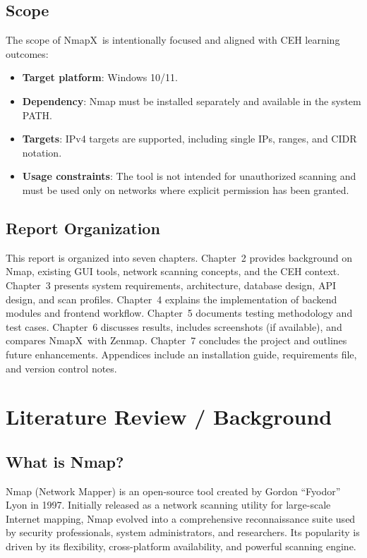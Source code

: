\documentclass[12pt, a4paper]{report}
\newcommand{\NmapX}{NmapX}
\begin{document}
\section{Scope}
The scope of \NmapX\ is intentionally focused and aligned with CEH learning outcomes:
\begin{itemize}[leftmargin=2.2em]
  \item \textbf{Target platform}: Windows 10/11.
  \item \textbf{Dependency}: Nmap must be installed separately and available in the system PATH.
  \item \textbf{Targets}: IPv4 targets are supported, including single IPs, ranges, and CIDR notation.
  \item \textbf{Usage constraints}: The tool is not intended for unauthorized scanning and must be used only on networks where explicit permission has been granted.
\end{itemize}

\section{Report Organization}
This report is organized into seven chapters. Chapter~2 provides background on Nmap, existing GUI tools, network scanning concepts, and the CEH context. Chapter~3 presents system requirements, architecture, database design, API design, and scan profiles. Chapter~4 explains the implementation of backend modules and frontend workflow. Chapter~5 documents testing methodology and test cases. Chapter~6 discusses results, includes screenshots (if available), and compares \NmapX\ with Zenmap. Chapter~7 concludes the project and outlines future enhancements. Appendices include an installation guide, requirements file, and version control notes.

\clearpage
\chapter{Literature Review / Background}

\section{What is Nmap?}
Nmap (Network Mapper) is an open-source tool created by Gordon ``Fyodor'' Lyon in 1997. Initially released as a network scanning utility for large-scale Internet mapping, Nmap evolved into a comprehensive reconnaissance suite used by security professionals, system administrators, and researchers. Its popularity is driven by its flexibility, cross-platform availability, and powerful scanning engine.
\end{document}
